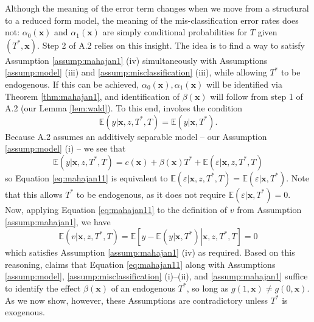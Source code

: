 Although the meaning of the error term changes when we move from a structural to a reduced form model, the meaning of the mis-classification error rates does not: $\alpha_0(\mathbf{x})$ and $\alpha_1(\mathbf{x})$ are simply conditional probabilities for $T$ given $(T^*,\mathbf{x})$.
Step 2 of \cite{Mahajan} A.2 relies on this insight.
The idea is to find a way to satisfy Assumption \ref{assump:mahajan1} (iv) simultaneously with Assumptions \ref{assump:model} (iii) and \ref{assump:misclassification} (iii), while allowing $T^*$ to be endogenous.
If this can be achieved, $\alpha_0(\mathbf{x}), \alpha_1(\mathbf{x})$ will be identified via Theorem \ref{thm:mahajan1}, and identification of $\beta(\mathbf{x})$ will follow from step 1 of A.2 (our Lemma \ref{lem:wald}).
To this end, \cite{Mahajan} invokes the condition 
\begin{equation}
  \mathbb{E}(y|\mathbf{x},z,T^*,T) = \mathbb{E}(y|\mathbf{x},T^*).
  \label{eq:mahajan11}
\end{equation}
Because \cite{Mahajan} A.2 assumes an additively separable model -- our Assumption \ref{assump:model} (i) -- we see that
\[
  \mathbb{E}(y|\mathbf{x},z,T^*,T) = c(\mathbf{x}) + \beta(\mathbf{x}) T^* + \mathbb{E}(\varepsilon|\mathbf{x},z,T^*,T)
\]
so Equation \ref{eq:mahajan11} is equivalent to $\mathbb{E}(\varepsilon|\mathbf{x},z,T^*,T)=\mathbb{E}(\varepsilon|\mathbf{x},T^*)$.
Note that this allows $T^*$ to be endogenous, as it does not require $\mathbb{E}(\varepsilon|\mathbf{x},T^*)=0$.
Now, applying Equation \ref{eq:mahajan11} to the definition of $v$ from Assumption \ref{assump:mahajan1}, we have
\[
  \mathbb{E}(v|\mathbf{x},z,T^*,T) = \mathbb{E}\left[ y - \mathbb{E}(y|\mathbf{x},T^*)\left. \right|\mathbf{x},z,T^*,T \right] = 0
\]
which satisfies Assumption \ref{assump:mahajan1} (iv) as required.
Based on this reasoning, \cite{Mahajan} claims that Equation \ref{eq:mahajan11} along with Assumptions \ref{assump:model}, \ref{assump:misclassification} (i)--(ii), and \ref{assump:mahajan1} suffice to identify the effect $\beta(\mathbf{x})$ of an endogenous $T^*$, so long as $g(1,\mathbf{x}) \neq g(0,\mathbf{x})$.
As we now show, however, these Assumptions are contradictory unless $T^*$ is exogenous.

